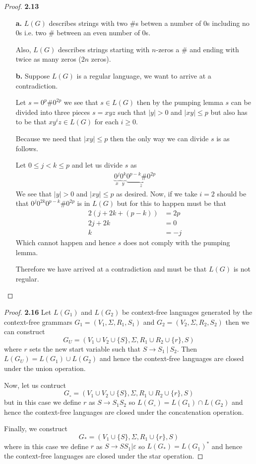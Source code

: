 \documentclass[11pt]{article}
\theoremstyle{definition}
\begin{document}
\begin{proof}{\textbf{2.13}}
\begin{itemize}
    \item [\textbf{a.}] $L(G)$ describes strings with two $\#$s
    betwen a number of $0$s including no $0$s i.e. two $\#$ between an even
    number of $0$s.

    Also, $L(G)$ describes strings starting with $n$-zeros a $\#$ and ending
    with twice as many zeros ($2n$ zeros).
    \item [\textbf{b.}] Suppose $L(G)$ is a regular language, we want to arrive
    at a contradiction.
    
    Let $s = 0^p\#0^{2p}$ we see that $s \in L(G)$ then by the
    pumping lemma $s$ can be divided into three pieces $s = xyz$ such that
    $|y| > 0$ and $|xy| \leq p$ but also has to be that $xy^iz \in L(G)$
    for each $i \geq 0$.

    Because we need that $|xy| \leq p$ then the only way we can divide $s$
    is as follows.

    Let $0 \leq j < k \leq p$ and let us divide $s$ as
    \begin{align*}
        \underbrace{0^j}_x\underbrace{0^k}_y\underbrace{0^{p - k}\#0^{2p}}_z
    \end{align*}
    We see that $|y| > 0$ and $|xy| \leq p$ as desired.  Now, if we take $i = 2$
    should be that $0^j0^{2k}0^{p-k}\#0^{2p}$ is in $L(G)$ but for this to
    happen must be that 
    \begin{align*}
        2(j + 2k + (p-k)) &= 2p\\
        2j + 2k &= 0\\
        k &= -j
    \end{align*}
    Which cannot happen and hence $s$ does not comply with the pumping lemma.

    Therefore we have arrived at a contradiction and must be that $L(G)$ is
    not regular.
\end{itemize}
\end{proof}
\cleardoublepage
\begin{proof}{\textbf{2.16}}
    Let $L(G_1)$ and $L(G_2)$ be context-free languages generated by the
    context-free grammars $G_1 = (V_1, \Sigma, R_1, S_1)$ and
    $G_2 = (V_2, \Sigma, R_2, S_2)$ then we can construct 
    $$G_U = (V_1 \cup V_2 \cup \{S\}, \Sigma, R_1 \cup R_2 \cup \{r\}, S)$$
    where $r$ sets the new start variable such that $S \to S_1~|~S_2$.
    Then $L(G_U) = L(G_1) \cup L(G_2)$ and hence the context-free languages are
    closed under the union operation.

    Now, let us contruct
    $$G_\circ = (V_1 \cup V_2 \cup \{S\}, \Sigma, R_1 \cup R_2 \cup \{r\}, S)$$
    but in this case we define $r$ as $S \to S_1S_2$ so
    $L(G_\circ) = L(G_1) \cap L(G_2)$ and hence the context-free languages are
    closed under the concatenation operation.

    Finally, we construct
    $$G_* = (V_1 \cup \{S\}, \Sigma, R_1 \cup \{r\}, S)$$
    where in this case we define $r$ as $S \to SS_1 | \varepsilon$ so
    $L(G_*) = L(G_1)^*$ and hence the context-free languages are
    closed under the star operation.
\end{proof}
\end{document}
